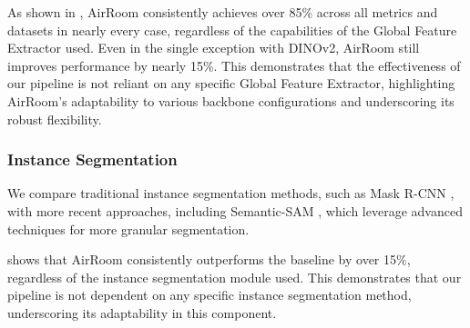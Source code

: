 As shown in , AirRoom consistently achieves over 85\% across all metrics and datasets in nearly every case, regardless of the capabilities of the Global Feature Extractor used. Even in the single exception with DINOv2, AirRoom still improves performance by nearly 15\%. This demonstrates that the effectiveness of our pipeline is not reliant on any specific Global Feature Extractor, highlighting AirRoom's adaptability to various backbone configurations and underscoring its robust flexibility.


\vspace{-5pt}
\subsubsection{Instance Segmentation}
\vspace{-4pt}
We compare traditional instance segmentation methods, such as Mask R-CNN \cite{he2018maskrcnn}, with more recent approaches, including Semantic-SAM \cite{li2023semanticsamsegmentrecognizegranularity}, which leverage advanced techniques for more granular segmentation.

 shows that AirRoom consistently outperforms the baseline by over 15\%, regardless of the instance segmentation module used. This demonstrates that our pipeline is not dependent on any specific instance segmentation method, underscoring its adaptability in this component.

\begin{table}[h]
\vspace{-5pt}
\centering
{}
\vspace{-10pt}
\caption{Instance Segmentation Flexibility.}
\vspace{-16pt}
\label{tab:is flexibility}
\end{table}



